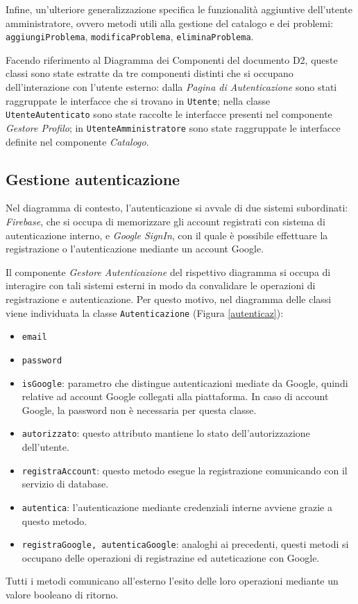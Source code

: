 \documentclass[11pt, a4paper]{article}
\theoremstyle{definition} %
\begin{document}
Infine, un'ulteriore generalizzazione specifica le funzionalità aggiuntive
dell'utente amministratore, ovvero metodi utili alla gestione del catalogo
e dei problemi:
\texttt{aggiungiProblema}, \texttt{modificaProblema}, \texttt{eliminaProblema}.


Facendo riferimento al Diagramma dei Componenti del
documento D2, queste classi sono state estratte da tre componenti
distinti che si occupano dell'interazione con l'utente esterno: dalla
\textit{Pagina di Autenticazione} sono stati raggruppate le interfacce che
si trovano in \texttt{Utente}; nella classe \texttt{UtenteAutenticato} sono state
raccolte le interfacce presenti nel componente \textit{Gestore Profilo};
in \texttt{UtenteAmministratore} sono state raggruppate le interfacce
definite nel componente \textit{Catalogo}.


\subsection{Gestione autenticazione}
Nel diagramma di contesto, l'autenticazione si avvale di due sistemi
subordinati: \textit{Firebase}, che si occupa di memorizzare gli account
registrati con sistema di autenticazione interno, e \textit{Google SignIn},
con il quale è possibile effettuare la registrazione o l'autenticazione
mediante un account Google.

Il componente \textit{Gestore Autenticazione} del rispettivo diagramma si
occupa di interagire con tali sistemi esterni in modo da convalidare le
operazioni di registrazione e autenticazione. Per questo motivo, nel diagramma
delle classi viene individuata la classe \texttt{Autenticazione} (Figura \ref{autenticaz}):
\begin{itemize}
    \item \texttt{email}
    \item \texttt{password}
    \item \texttt{isGoogle}: parametro che distingue autenticazioni mediate
    da Google, quindi relative ad account Google collegati alla piattaforma.
    In caso di account Google, la password non è necessaria per questa classe.

    \item \texttt{autorizzato}: questo attributo mantiene lo stato dell'autorizzazione
    dell'utente.

    \item \texttt{registraAccount}: questo metodo esegue la registrazione
    comunicando con il servizio di database.
    \item \texttt{autentica}: l'autenticazione mediante credenziali interne
    avviene grazie a questo metodo.
    \item \texttt{registraGoogle, autenticaGoogle}: analoghi ai precedenti,
    questi metodi si occupano delle operazioni di registrazine ed auteticazione
    con Google.
\end{itemize}
Tutti i metodi comunicano all'esterno l'esito delle loro operazioni mediante
un valore booleano di ritorno.
\end{document}
